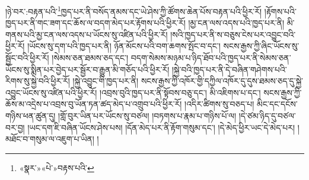 །ཉེ་བར་:བརྟན་པའི་\footnote{«སྣར་»«པེ་»བརྟས་པའི་}ཁྱད་པར་ནི་བསོད་ནམས་དང་ཡེ་ཤེས་ཀྱི་ཚོགས་ཆེན་པོས་བརྟན་པའི་ཕྱིར་རོ། །རྟོགས་པའི་ཁྱད་པར་ནི་གང་ཟག་དང་ཆོས་ལ་བདག་མེད་པར་རྟོགས་པའི་ཕྱིར་རོ། །མྱ་ངན་ལས་འདས་པའི་ཁྱད་པར་ནི། མི་གནས་པའི་མྱ་ངན་ལས་འདས་པ་ཡོངས་སུ་འཛིན་པའི་ཕྱིར་རོ། །སའི་ཁྱད་པར་ནི་ས་བཅུས་ངེས་པར་འབྱུང་བའི་ཕྱིར་རོ། །ཡོངས་སུ་དག་པའི་ཁྱད་པར་ནི། ཉོན་མོངས་པའི་བག་ཆགས་སྤོང་བ་དང་། སངས་རྒྱས་ཀྱི་ཞིང་ཡོངས་སུ་སྦྱོང་བའི་ཕྱིར་རོ། །སེམས་ཅན་ཐམས་ཅད་དང་། བདག་སེམས་མཉམ་པ་ཉིད་ཐོབ་པའི་ཁྱད་པར་ནི་སེམས་ཅན་ཡོངས་སུ་སྨིན་པར་བྱེད་པར་སྦྱོར་བ་རྒྱུན་མི་གཅོད་པའི་ཕྱིར་རོ། །སྐྱེ་བའི་ཁྱད་པར་ནི་དེ་བཞིན་གཤེགས་པའི་རིགས་སུ་སྐྱེ་བའི་ཕྱིར་རོ། །སྐྱེ་འབྱུང་གི་ཁྱད་པར་ནི། སངས་རྒྱས་ཀྱི་འཁོར་གྱི་དཀྱིལ་འཁོར་དུ་དུས་ཐམས་ཅད་དུ་སྐྱེ་འབྱུང་ཡོངས་སུ་འཛིན་པའི་ཕྱིར་རོ། །འབྲས་བུའི་ཁྱད་པར་ནི་སྟོབས་བཅུ་དང་། མི་འཇིགས་པ་དང་། སངས་རྒྱས་ཀྱི་ཆོས་མ་འདྲེས་པ་འབྲས་བུ་ཡོན་ཏན་ཚད་མེད་པ་འགྲུབ་པའི་ཕྱིར་རོ། །འདིར་ཚིགས་སུ་བཅད་པ། མིང་དང་དངོས་གཉིས་ཕན་ཚུན་དུ། །གློ་བུར་ཡིན་པར་ཡོངས་སུ་བཙལ། །བཏགས་པ་རྣམ་པ་གཉིས་པོ་ལ། །དེ་ཙམ་ཉིད་དུ་བཙལ་བར་བྱ། །ཡང་དག་ཇི་བཞིན་ཡོངས་ཤེས་པས། །དོན་མེད་པར་ནི་རྟོག་གསུམ་དང་། །དེ་མེད་ཕྱིར་ཡང་དེ་མེད་པར། །མཐོང་བ་གསུམ་ལ་འཇུག་པ་ཡིན། །
